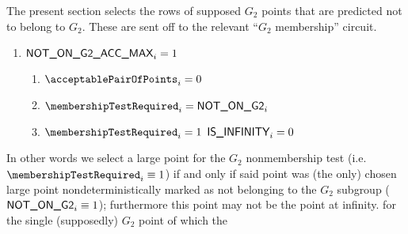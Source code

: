 The present section selects the rows of supposed $G_2$ points that are predicted not to belong to $G_2$.
These are sent off to the relevant ``$G_2$ membership'' circuit.
\begin{enumerate}
    \item \If $\textsf{NOT\_ON\_G2\_ACC\_MAX}_{i} = 1$ \Then
          \begin{enumerate}
              \item
                  $\acceptablePairOfPoints_{i} = 0$
              \item\label{prc: ec data: successful pairing: setting G2 non membership}
                  $\membershipTestRequired _{i}  =  \notOnGTwo_{i}$
              \item
                  \If $\membershipTestRequired _{i} = 1$ \Then $\textsf{IS\_INFINITY}_{i} = 0$
          \end{enumerate}
\end{enumerate}
In other words we select a large point for the $G_2$ nonmembership test (i.e. $\membershipTestRequired _{i} \equiv 1$) if and only if said point was (the only)
chosen large point nondeterministically marked as not belonging to the $G_2$ subgroup ($\textsf{NOT\_ON\_G2}_{i} \equiv 1$);
furthermore this point may not be the point at infinity.
for the single (supposedly) $G_{2}$ point of which the \zkEvm{} 
